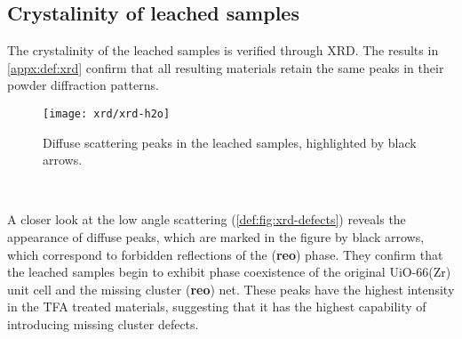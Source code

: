
\subsection{Crystalinity of leached samples}\label{def:xrd}

The crystalinity of the leached samples is verified through 
\gls{XRD}. The results in \autoref{appx:def:xrd} confirm that all 
resulting materials retain the same peaks in their powder
diffraction patterns.

\begin{figure}[b]
    \centering
    \texttt{[image: xrd/xrd-h2o]}
    \caption{Diffuse scattering peaks in the  leached 
    samples, highlighted by black arrows.
    }\label{def:fig:xrd-defects}
\end{figure}\

A closer look at the low angle scattering (\autoref{def:fig:xrd-defects})
reveals the appearance of diffuse peaks, which are marked in the 
figure by black arrows, which correspond to forbidden
reflections of the (\textbf{reo}) phase. They confirm that the 
leached samples begin to exhibit phase coexistence of 
the original UiO-66(Zr) unit cell and the missing cluster
(\textbf{reo}) net. These peaks have the highest intensity in 
the \gls{TFA} treated materials, suggesting that it has the highest 
capability of introducing missing cluster defects.